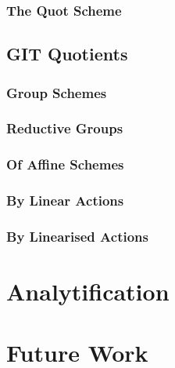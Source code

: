 \documentclass[12pt]{ociamthesis}  %
\begin{document}
\missingsection

\subsection{The Quot Scheme}

\missingsection

\section{GIT Quotients}

\missingsection

\subsection{Group Schemes}

\missingsection

\subsection{Reductive Groups}

\missingsection

\subsection{Of Affine Schemes}

\missingsection

\subsection{By Linear Actions}

\missingsection

\subsection{By Linearised Actions}

\missingsection

\chapter{Analytification}

\missingsection

\chapter{Future Work}

\missingsection

\renewcommand{\bibname}{References}
\printbibliography
\end{document}
